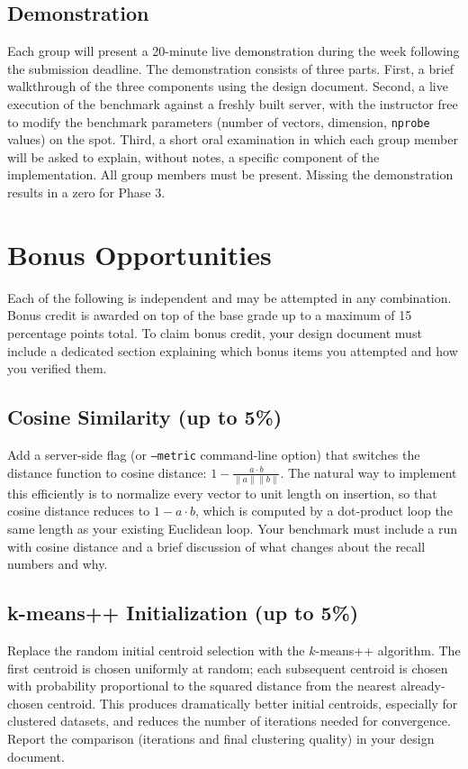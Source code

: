 \documentclass[11pt,a4paper]{article}
\begin{document}
\subsection{Demonstration}
Each group will present a 20-minute live demonstration during the week following the submission deadline. The demonstration consists of three parts. First, a brief walkthrough of the three components using the design document. Second, a live execution of the benchmark against a freshly built server, with the instructor free to modify the benchmark parameters (number of vectors, dimension, \texttt{nprobe} values) on the spot. Third, a short oral examination in which each group member will be asked to explain, without notes, a specific component of the implementation. All group members must be present. Missing the demonstration results in a zero for Phase 3.

\section{Bonus Opportunities}

Each of the following is independent and may be attempted in any combination. Bonus credit is awarded on top of the base grade up to a maximum of 15 percentage points total. To claim bonus credit, your design document must include a dedicated section explaining which bonus items you attempted and how you verified them.

\subsection{Cosine Similarity (up to 5\%)}
Add a server-side flag (or \texttt{--metric} command-line option) that switches the distance function to cosine distance: $1 - \frac{a \cdot b}{\|a\|\|b\|}$. The natural way to implement this efficiently is to normalize every vector to unit length on insertion, so that cosine distance reduces to $1 - a \cdot b$, which is computed by a dot-product loop the same length as your existing Euclidean loop. Your benchmark must include a run with cosine distance and a brief discussion of what changes about the recall numbers and why.

\subsection{k-means++ Initialization (up to 5\%)}
Replace the random initial centroid selection with the $k$-means++ algorithm. The first centroid is chosen uniformly at random; each subsequent centroid is chosen with probability proportional to the squared distance from the nearest already-chosen centroid. This produces dramatically better initial centroids, especially for clustered datasets, and reduces the number of iterations needed for convergence. Report the comparison (iterations and final clustering quality) in your design document.
\end{document}

